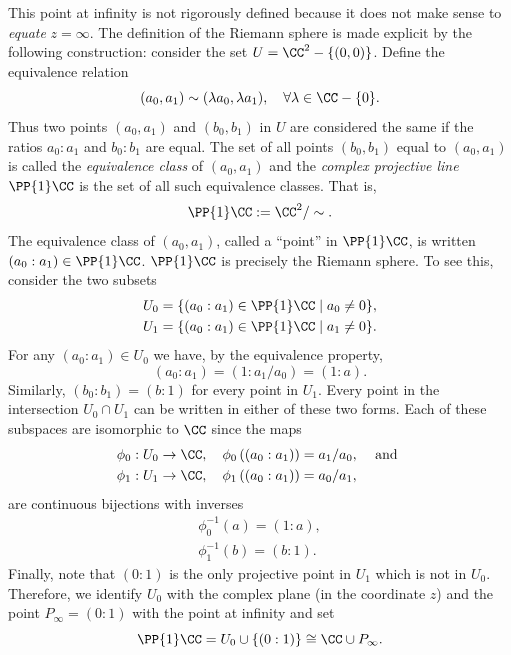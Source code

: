 This point at infinity is not rigorously defined because it does not
make sense to {\it equate} $z=\infty$. The definition of the Riemann
sphere is made explicit by the following construction: consider the set
$U = \CC^2 - \{(0,0)\}$. Define the equivalence relation
\[
    (a_0, a_1) \sim (\lambda a_0, \lambda a_1),
    \quad \forall \lambda \in \CC - \{0\}.
\]
Thus two points $(a_0,a_1)$ and $(b_0,b_1)$ in $U$ are considered the
same if the ratios $a_0 : a_1$ and $b_0 : b_1$ are equal. The set of all
points $(b_0,b_1)$ equal to $(a_0,a_1)$ is called the {\it equivalence
  class} of $(a_0,a_1)$ and the {\it complex projective line} $\PP{1}\CC$
is the set of all such equivalence classes. That is,
\[
    \PP{1}\CC := \CC^2 / \sim.
\]
The equivalence class of $(a_0,a_1)$, called a ``point'' in $\PP{1}\CC$,
is written $(a_0 : a_1) \in \PP{1}\CC$. $\PP{1}\CC$ is precisely the
Riemann sphere. To see this, consider the two subsets
\begin{align*}
    U_0 &= \{ (a_0 : a_1) \in \PP{1}\CC \; | \; a_0 \neq 0 \}, \\
    U_1 &= \{ (a_0 : a_1) \in \PP{1}\CC \; | \; a_1 \neq 0 \}.
\end{align*}
For any $(a_0 : a_1) \in U_0$ we have, by the equivalence property,
\[
    (a_0 : a_1) = (1 : a_1/a_0) = (1 : a).
\]
Similarly, $(b_0 : b_1) = (b : 1)$ for every point in $U_1$. Every point
in the intersection $U_0 \cap U_1$ can be written in either of these two
forms. Each of these subspaces are isomorphic to $\CC$ since the maps
\begin{align*}
  \phi_0 : U_0 \to \CC,
  \quad
  \phi_0 \left( (a_0 : a_1) \right) = a_1 / a_0,
  & \quad \text{ and } \\
  \phi_1 : U_1 \to \CC,
  \quad
  \phi_1 \left( (a_0 : a_1) \right) = a_0 / a_1, &
\end{align*}
are continuous bijections with inverses
\begin{gather}
  \phi^{-1}_0(a) = (1 : a), \\
  \phi^{-1}_1(b) = (b : 1).
\end{gather}
Finally, note that $(0 : 1)$ is the only projective point in $U_1$ which
is not in $U_0$. Therefore, we identify $U_0$ with the complex plane (in
the coordinate $z$) and the point $P_\infty = (0 : 1)$ with the point at
infinity and set
\begin{equation} \label{eqn: projective-line}
  \PP{1}\CC = U_0 \cup \{ (0 : 1) \} \cong \CC \cup P_\infty.
\end{equation}

